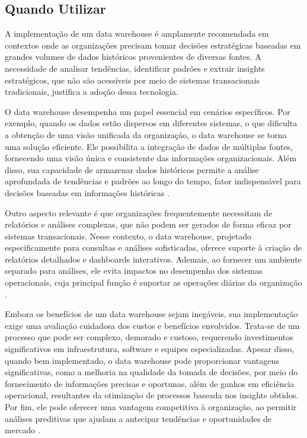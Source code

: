 \subsection{Quando Utilizar}
A implementação de um data warehouse é amplamente recomendada em contextos onde as organizações precisam tomar decisões estratégicas baseadas 
em grandes volumes de dados históricos provenientes de diversas fontes. A necessidade de analisar tendências, identificar padrões e extrair 
insights estratégicos, que não são acessíveis por meio de sistemas transacionais tradicionais, justifica a adoção dessa tecnologia.

O data warehouse desempenha um papel essencial em cenários específicos. Por exemplo, quando os dados estão dispersos em diferentes sistemas, 
o que dificulta a obtenção de uma visão unificada da organização, o data warehouse se torna uma solução eficiente. Ele possibilita a integração 
de dados de múltiplas fontes, fornecendo uma visão única e consistente das informações organizacionais. Além disso, sua capacidade de armazenar 
dados históricos permite a análise aprofundada de tendências e padrões ao longo do tempo, fator indispensável para decisões baseadas em informações 
históricas \cite{santoso2017data}.

Outro aspecto relevante é que organizações frequentemente necessitam de relatórios e análises complexas, que não podem ser gerados de forma 
eficaz por sistemas transacionais. Nesse contexto, o data warehouse, projetado especificamente para consultas e análises sofisticadas, oferece 
suporte à criação de relatórios detalhados e dashboards interativos. Ademais, ao fornecer um ambiente separado para análises, ele evita 
impactos no desempenho dos sistemas operacionais, cuja principal função é suportar as operações diárias da organização \cite{santoso2017data}.

Embora os benefícios de um data warehouse sejam inegáveis, sua implementação exige uma avaliação cuidadosa dos custos e benefícios envolvidos. 
Trata-se de um processo que pode ser complexo, demorado e custoso, requerendo investimentos significativos em infraestrutura, software e 
equipes especializadas. Apesar disso, quando bem implementado, o data warehouse pode proporcionar vantagens significativas, como a melhoria 
na qualidade da tomada de decisões, por meio do fornecimento de informações precisas e oportunas, além de ganhos em eficiência operacional, 
resultantes da otimização de processos baseada nos insights obtidos. Por fim, ele pode oferecer uma vantagem competitiva à organização, ao 
permitir análises preditivas que ajudam a antecipar tendências e oportunidades de mercado \cite{vaisman2014data, mousa2015data}.

